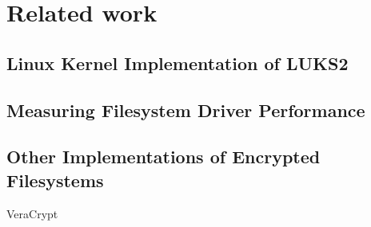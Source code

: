 \section{Related work}

\subsection{Linux Kernel Implementation of LUKS2}

\subsection{Measuring Filesystem Driver Performance}

\subsection{Other Implementations of Encrypted Filesystems}
VeraCrypt